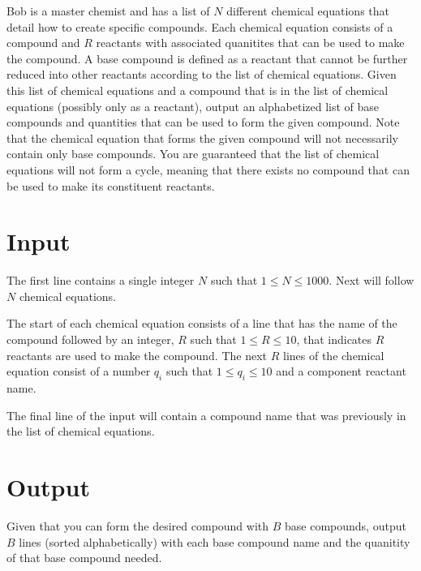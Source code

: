 
Bob is a master chemist and has a list of $N$ different chemical equations that detail how to create specific
compounds. Each chemical equation consists of a compound and $R$ reactants with associated quanitites that
can be used to make the compound. A base compound is defined as a reactant that cannot be further reduced into
other reactants according to the list of chemical equations. Given this list of chemical equations and a 
compound that is in the list of chemical equations (possibly only as a reactant), output an alphabetized list
of base compounds and quantities that can be used to form the given compound. Note that the chemical equation
that forms the given compound will not necessarily contain only base compounds. You are guaranteed that the
list of chemical equations will not form a cycle, meaning that there exists no compound that can be used to 
make its constituent reactants.

\section*{Input}
The first line contains a single integer $N$ such that $1 \leq N \leq 1000$.
Next will follow $N$ chemical equations. 

The start of each chemical equation consists of a line that has the name of the compound followed by an integer,
$R$ such that $1 \leq R \leq 10$, that indicates $R$ reactants are used to make the compound. The next $R$ 
lines of the chemical equation consist of a number $q_i$ such that $1 \leq q_i \leq 10$ and a component reactant
name.

The final line of the input will contain a compound name that was previously in the list of chemical
equations.

\section*{Output}
Given that you can form the desired compound with $B$ base compounds, output $B$ lines (sorted alphabetically)
with each base compound name and the quanitity of that base compound needed.
